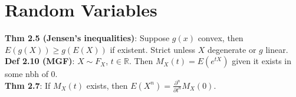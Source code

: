 \section{Random Variables}
\textbf{Thm 2.5 (Jensen's inequalities)}: Suppose $g(x)$ convex, then $E(g(X)) \geq g(E(X))$ if existent. Strict unless $X$ degenerate or $g$ linear.\\
\textbf{Def 2.10 (MGF)}: $X\sim F_X$, $t\in\mathbb{R}$. Then $M_X(t) = E(e^{tX})$ given it exists in some nbh of 0.\\
\textbf{Thm 2.7}: If $M_X(t)$ exists, then $E(X^n) = \frac{\partial^n}{\partial t^n}M_X(0)$. %
